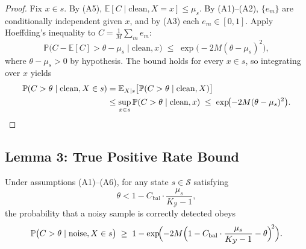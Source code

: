 \begin{proof}
Fix $x \in s$. By (A5), $\mathbb{E}[C \mid \text{clean}, X = x] \leq \mu_s$.
By (A1)--(A2), $\{e_m\}$ are conditionally independent given $x$, and by
(A3) each $e_m \in [0,1]$. Apply Hoeffding's inequality
\cite{hoeffding1963} to $C = \frac{1}{M}\sum_{m} e_m$:
\[
\mathbb{P}\bigl(C - \mathbb{E}[C] > \theta - \mu_s \mid \text{clean}, x\bigr)
\;\leq\; \exp\!\bigl(-2M(\theta - \mu_s)^2\bigr),
\]
where $\theta - \mu_s > 0$ by hypothesis. The bound holds for every $x \in s$,
so integrating over $x$ yields
\begin{align*}
\mathbb{P}(C > \theta \mid \text{clean}, X \in s)
&= \mathbb{E}_{X \mid s}\bigl[ \mathbb{P}(C > \theta \mid \text{clean}, X) \bigr] \\
&\leq \sup_{x \in s} \mathbb{P}(C > \theta \mid \text{clean}, x)
\;\leq\; \exp\!\bigl(-2M(\theta - \mu_s)^2\bigr). \qedhere
\end{align*}
\end{proof}

\subsection{Lemma 3: True Positive Rate Bound}
\label{sec:thm1:lemma3}

\begin{lemma}
\label{lem:tpr-bound}
Under assumptions (A1)--(A6), for any state $s \in \mathcal{S}$ satisfying
\[
\theta < 1 - C_{\text{bal}}\cdot\frac{\mu_s}{K_{\mathcal{Y}}-1},
\]
the probability that a noisy sample is correctly detected obeys
\begin{equation}
\mathbb{P}\bigl(C > \theta \mid \text{noise}, X \in s\bigr)
\;\geq\; 1 - \exp\!\Bigl(
  -2M\Bigl(1 - C_{\text{bal}}\cdot\frac{\mu_s}{K_{\mathcal{Y}}-1}
  - \theta\Bigr)^{\!2}\Bigr).
\label{eq:tpr-bound}
\end{equation}
\end{lemma}

